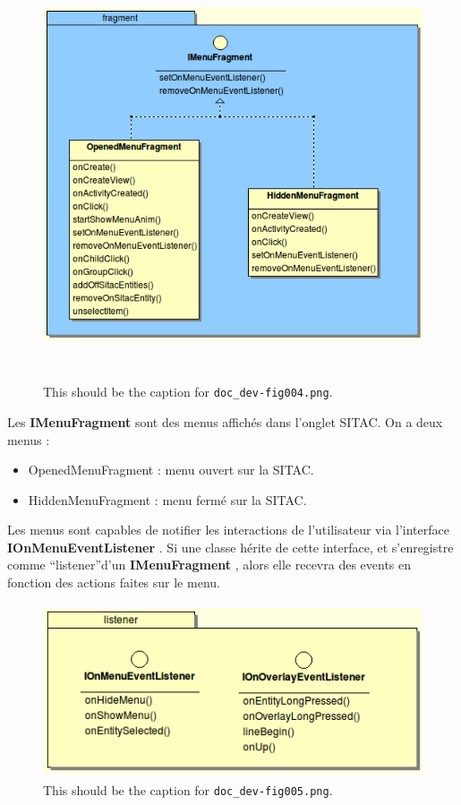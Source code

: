 \documentclass{article}
\begin{document}
\begin{figure}[htbp]
\begin{center}
\includegraphics[width=391pt, height=344pt]{doc_dev-fig004.png}
\caption{This should be the caption for \texttt{doc\_dev-fig004.png}.}
\end{center}
\end{figure}

Les \textbf{IMenuFragment} sont des menus affichés dans l'onglet SITAC. On a deux menus : 

\begin{itemize}
\item OpenedMenuFragment : menu ouvert sur la SITAC.

\item HiddenMenuFragment : menu fermé sur la SITAC.

\end{itemize}

\parindent=0pt
{ Les menus sont capables de notifier les interactions de l'utilisateur 
via l'interface }{ \textbf{IOnMenuEventListener}}{ . 
Si une classe hérite de cette interface, et s'enregistre comme ``listener''d'un 
}{ \textbf{IMenuFragment}}{ , alors elle recevra 
des events en fonction des actions faites sur le menu.}

\begin{figure}[htbp]
\begin{center}
\includegraphics[width=332pt, height=145pt]{doc_dev-fig005.png}
\caption{This should be the caption for \texttt{doc\_dev-fig005.png}.}
\end{center}
\end{figure}
\end{document}

